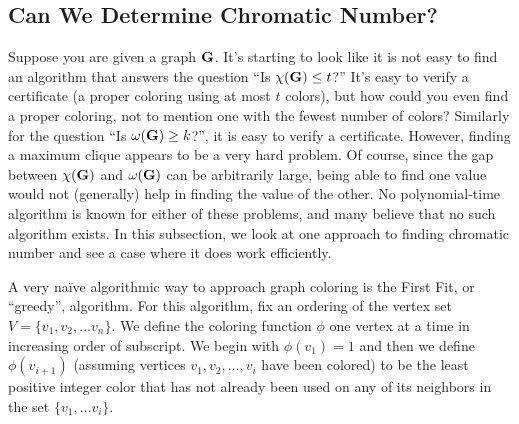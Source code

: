 \subsection{Can We Determine Chromatic Number?}

Suppose you are given a graph $\mathbf{G}$. It's starting to look like it is
not easy to find an algorithm that answers the question ``Is
$\chi(\mathbf{G})\leq t$?'' It's easy to verify a certificate (a proper
coloring using at most $t$ colors), but how could you even find a
proper coloring, not to mention one with the fewest number of colors?
Similarly for the question ``Is $\omega(\mathbf{G})\geq k$?'', it is easy to
verify a certificate. However, finding a maximum clique appears to be
a very hard problem. Of course, since the gap between $\chi(\mathbf{G})$ and
$\omega(\mathbf{G})$ can be arbitrarily large, being able to find one value
would not (generally) help in finding the value of the other. No
polynomial-time algorithm is known for either of these problems, and
many believe that no such algorithm exists. In this subsection, we
look at one approach to finding chromatic number and see a case where
it does work efficiently.

A very na\"ive algorithmic way to approach graph coloring is the First
Fit, or ``greedy'', algorithm. For this algorithm, fix an ordering of
the vertex set $V=\{v_1,v_2,\dots v_n\}$. We define the coloring
function $\phi$ one vertex at a time in increasing order of
subscript. We begin with $\phi(v_1)=1$ and then we define
$\phi(v_{i+1})$ (assuming vertices $v_1,v_2,\dots,v_i$ have been
colored) to be the least positive integer color that has not already
been used on any of its neighbors in the set $\{v_1,\dots v_i\}$.

